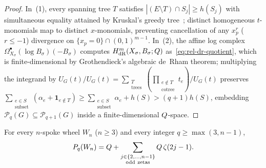 \begin{proof}
In~(1), every spanning tree $T$ satisfies $|(E\setminus T)\cap S_j| \ge h(S_j)$ with simultaneous equality attained by Kruskal's greedy tree~\cite{Panzer15}; distinct homogeneous $t$-monomials map to distinct $x$-monomials, preventing cancellation of any $x_p^{r}$ ($r \le -1$) divergence on $\{x_p=0\}\cap(0,1)^{m-1}$. In~(2), the affine log complex $\Omega^\bullet_{X_\sigma}(\log B_\sigma)(-B_\sigma)$ computes $H^m_{\mathrm{dR}}(X_\sigma,B_\sigma;Q)$ as~\eqref{eq:rel-dr-quotient}, which is finite-dimensional by Grothendieck's algebraic de~Rham theorem; multiplying the integrand by $U_G(t)/U_G(t) = \sum_{\substack{T\\\mathrm{trees}}}(\prod_{\substack{e\notin T\\\mathrm{cotree}}}t_e)/U_G(t)$ preserves $\sum_{\substack{e\in S\\\mathrm{subset}}}(\alpha_e + \mathbf{1}_{e\notin T}) \ge \sum_{\substack{e\in S\\\mathrm{subset}}}\alpha_e + h(S) > (q+1)h(S)$, embedding $\mathcal{P}_q(G) \subseteq \mathcal{P}_{q+1}(G)$ inside a finite-dimensional $Q$-space.
\end{proof}

\begin{theorem}
\label{thm:wheel-span}
For every $n$-spoke wheel $W_n$ ($n \ge 3$) and every integer $q \ge \max(3, n-1)$,
\begin{equation}
\label{eq:wheel-exact-span}
\mathcal{P}_q(W_n) = \QQ + \sum_{\substack{j\in\{2,\dots,n-1\}\\\mathrm{odd\ zetas}}}\QQ\,\zeta(2j-1).
\end{equation}
\end{theorem}

